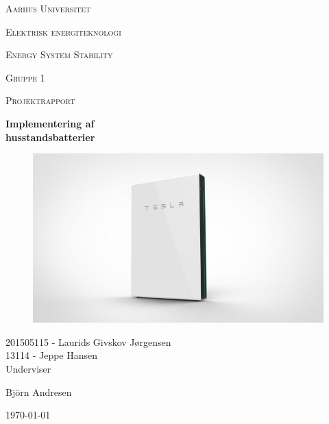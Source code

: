 \thispagestyle{empty}
	{\centering
	{\scshape\LARGE Aarhus Universitet \par}
	\vspace{1cm}
	{\scshape\Large Elektrisk energiteknologi\par}
	\vspace{0.5cm}
	{\scshape\Large Energy System Stability\par}
	{\scshape\Large Gruppe 1\par}
	{\scshape\Large Projektrapport\par}
	\vspace{1.5cm}
	{\huge\bfseries Implementering af\\ husstandsbatterier\par}
	\vspace{2cm}
	
	\begin{figure}[H] %
		\centering
		\includegraphics[width=1\textwidth]{figurer/Forside}
		\label{fig:Forside}
	\end{figure}

	{\Large
	201505115 - Laurids Givskov Jørgensen\\
	13114 - Jeppe Hansen\\   }
	\vfill
	Underviser\par
	Björn Andresen

	\vfill

	{\large \today\par}
\par}